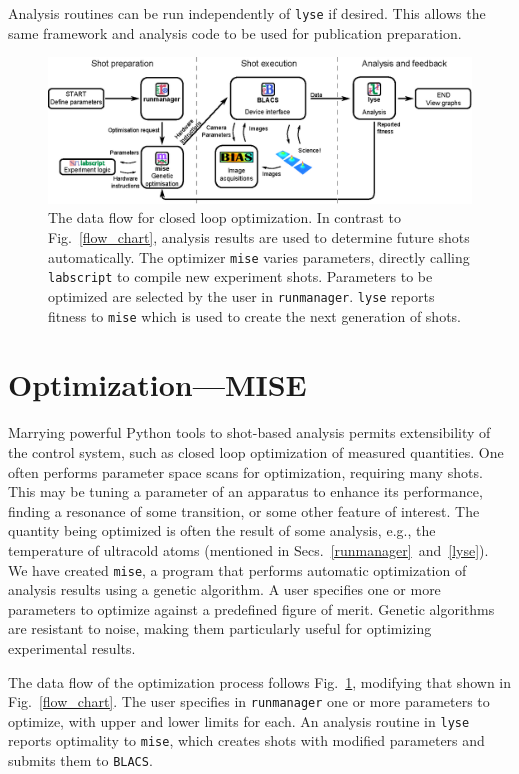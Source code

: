 Analysis routines can be run independently of \texttt{lyse} if desired.
This allows the same framework and analysis code to be used for publication preparation.

\begin{figure}%
\includegraphics{figures/software/flow_chart_mise.eps}%
\caption{The data flow for closed loop optimization.
In contrast to Fig.~\ref{flow_chart}, analysis results are used to determine future shots automatically.
The optimizer \texttt{mise} varies parameters, directly calling \texttt{labscript} to compile new experiment shots.
Parameters to be optimized are selected by the user in \texttt{runmanager}.
\texttt{lyse} reports fitness to \texttt{mise} which is used to create the next generation of shots.
}%
\label{flow_chart_mise}%
\end{figure}

\section{Optimization---MISE\label{mise}}

Marrying powerful Python tools to shot-based analysis permits extensibility of the control system, such as closed loop optimization of measured quantities.
One often performs parameter space scans for optimization, requiring many shots.
This may be tuning a parameter of an apparatus to enhance its performance, finding a resonance of some transition, or some other feature of interest.
The quantity being optimized is often the result of some analysis, e.g., the temperature of ultracold atoms (mentioned in Secs.~\ref{runmanager}~and~\ref{lyse}).
We have created \texttt{mise}, a program that performs automatic optimization of analysis results using a genetic algorithm\cite{back_overview_1993}.
A user specifies one or more parameters to optimize against a predefined figure of merit.
Genetic algorithms are resistant to noise, making them particularly useful for optimizing experimental results.

The data flow of the optimization process follows Fig.~\ref{flow_chart_mise}, modifying that shown in Fig.~\ref{flow_chart}.
The user specifies in \texttt{runmanager} one or more parameters to optimize, with upper and lower limits for each.
An analysis routine in \texttt{lyse} reports optimality to \texttt{mise}, which creates shots with modified parameters and submits them to \texttt{BLACS}.


